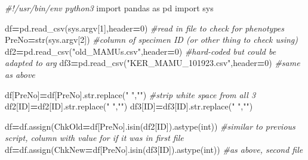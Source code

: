 \documentclass[
]{article}
\newenvironment{Shaded}{\begin{snugshade}}{\end{snugshade}}
\newcommand{\BuiltInTok}[1]{#1}
\newcommand{\CommentTok}[1]{\textcolor[rgb]{0.56,0.35,0.01}{\textit{#1}}}
\newcommand{\DecValTok}[1]{\textcolor[rgb]{0.00,0.00,0.81}{#1}}
\newcommand{\ImportTok}[1]{#1}
\newcommand{\NormalTok}[1]{#1}
\newcommand{\OperatorTok}[1]{\textcolor[rgb]{0.81,0.36,0.00}{\textbf{#1}}}
\newcommand{\StringTok}[1]{\textcolor[rgb]{0.31,0.60,0.02}{#1}}
\begin{document}
\begin{Shaded}
\begin{Highlighting}[]
\CommentTok{\#!/usr/bin/env python3}
\ImportTok{import}\NormalTok{ pandas }\ImportTok{as}\NormalTok{ pd}
\ImportTok{import}\NormalTok{ sys}

\NormalTok{df}\OperatorTok{=}\NormalTok{pd.read\_csv(sys.argv[}\DecValTok{1}\NormalTok{],header}\OperatorTok{=}\DecValTok{0}\NormalTok{) }\CommentTok{\#read in file to check for phenotypes}
\NormalTok{PreNo}\OperatorTok{=}\BuiltInTok{str}\NormalTok{(sys.argv[}\DecValTok{2}\NormalTok{]) }\CommentTok{\#column of specimen ID (or other thing to check using)}
\NormalTok{df2}\OperatorTok{=}\NormalTok{pd.read\_csv(}\StringTok{"old\_MAMUs.csv"}\NormalTok{,header}\OperatorTok{=}\DecValTok{0}\NormalTok{) }\CommentTok{\#hard{-}coded but could be adapted to arg}
\NormalTok{df3}\OperatorTok{=}\NormalTok{pd.read\_csv(}\StringTok{"KER\_MAMU\_101923.csv"}\NormalTok{,header}\OperatorTok{=}\DecValTok{0}\NormalTok{) }\CommentTok{\#same as above}

\NormalTok{df[PreNo]}\OperatorTok{=}\NormalTok{df[PreNo].}\BuiltInTok{str}\NormalTok{.replace(}\StringTok{" "}\NormalTok{,}\StringTok{""}\NormalTok{) }\CommentTok{\#strip white space from all 3}
\NormalTok{df2[}\StringTok{\textquotesingle{}ID\textquotesingle{}}\NormalTok{]}\OperatorTok{=}\NormalTok{df2[}\StringTok{\textquotesingle{}ID\textquotesingle{}}\NormalTok{].}\BuiltInTok{str}\NormalTok{.replace(}\StringTok{" "}\NormalTok{,}\StringTok{""}\NormalTok{)}
\NormalTok{df3[}\StringTok{\textquotesingle{}ID\textquotesingle{}}\NormalTok{]}\OperatorTok{=}\NormalTok{df3[}\StringTok{\textquotesingle{}ID\textquotesingle{}}\NormalTok{].}\BuiltInTok{str}\NormalTok{.replace(}\StringTok{" "}\NormalTok{,}\StringTok{""}\NormalTok{)}

\NormalTok{df}\OperatorTok{=}\NormalTok{df.assign(ChkOld}\OperatorTok{=}\NormalTok{df[PreNo].isin(df2[}\StringTok{\textquotesingle{}ID\textquotesingle{}}\NormalTok{]).astype(}\BuiltInTok{int}\NormalTok{)) }\CommentTok{\#similar to previous script, column with value for if it was in first file}
\NormalTok{df}\OperatorTok{=}\NormalTok{df.assign(ChkNew}\OperatorTok{=}\NormalTok{df[PreNo].isin(df3[}\StringTok{\textquotesingle{}ID\textquotesingle{}}\NormalTok{]).astype(}\BuiltInTok{int}\NormalTok{)) }\CommentTok{\#as above, second file}


\end{Highlighting}
\end{Shaded}
\end{document}
